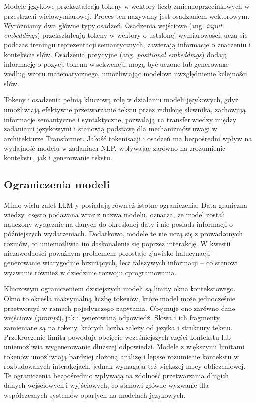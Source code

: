 Modele językowe przekształcają tokeny w wektory liczb zmiennoprzecinkowych w przestrzeni wielowymiarowej. Proces ten nazywany jest osadzaniem wektorowym. Wyróżniamy dwa główne typy osadzeń. Osadzenia wejściowe (ang. \textit{input embeddings}) przekształcają tokeny w wektory o ustalonej wymiarowości, uczą się podczas treningu reprezentacji semantycznych, zawierają informacje o znaczeniu i kontekście słów. Osadzenia pozycyjne (ang. \textit{positional embeddings}) dodają informację o pozycji tokenu w sekwencji, mogą być uczone lub generowane według wzoru matematycznego, umożliwiając modelowi uwzględnienie kolejności słów.

Tokeny i osadzenia pełnią kluczową rolę w działaniu modeli językowych, gdyż umożliwiają efektywne przetwarzanie tekstu przez redukcję słownika, zachowują informacje semantyczne i syntaktyczne, pozwalają na transfer wiedzy między zadaniami językowymi i stanowią podstawę dla mechanizmów uwagi w architekturze Transformer. Jakość tokenizacji i osadzeń ma bezpośredni wpływ na wydajność modelu w zadaniach NLP, wpływając zarówno na zrozumienie kontekstu, jak i generowanie tekstu.\cite{hands-on-llm24}

\subsection{Ograniczenia modeli}
Mimo wielu zalet LLM-y posiadają również istotne ograniczenia. Data graniczna wiedzy, często podawana wraz z nazwą modelu, oznacza, że model został nauczony wyłącznie na danych do określonej daty i nie posiada informacji o późniejszych wydarzeniach. Dodatkowo, modele te nie uczą się z prowadzonych rozmów, co uniemożliwia im doskonalenie się poprzez interakcję. W kwestii niezawodności poważnym problemem pozostaje zjawisko halucynacji – generowanie wiarygodnie brzmiących, lecz fałszywych informacji – co stanowi wyzwanie również w dziedzinie rozwoju oprogramowania.

Kluczowym ograniczeniem dzisiejszych modeli są limity okna kontekstowego. Okno to określa maksymalną liczbę tokenów, które model może jednocześnie przetworzyć w ramach pojedynczego zapytania. Obejmuje ono zarówno dane wejściowe (\textit{prompt}), jak i generowaną odpowiedź. Słowa i ich fragmenty zamieniane są na tokeny, których liczba zależy od języka i struktury tekstu. Przekroczenie limitu powoduje obcięcie wcześniejszych części kontekstu lub uniemożliwia wygenerowanie dłuższej odpowiedzi. Modele z większymi limitami tokenów umożliwiają bardziej złożoną analizę i lepsze rozumienie kontekstu w rozbudowanych interakcjach, jednak wymagają też większej mocy obliczeniowej. Te ograniczenia bezpośrednio wpływają na zdolność przetwarzania długich danych wejściowych i wyjściowych, co stanowi główne wyzwanie dla współczesnych systemów opartych na modelach językowych.

